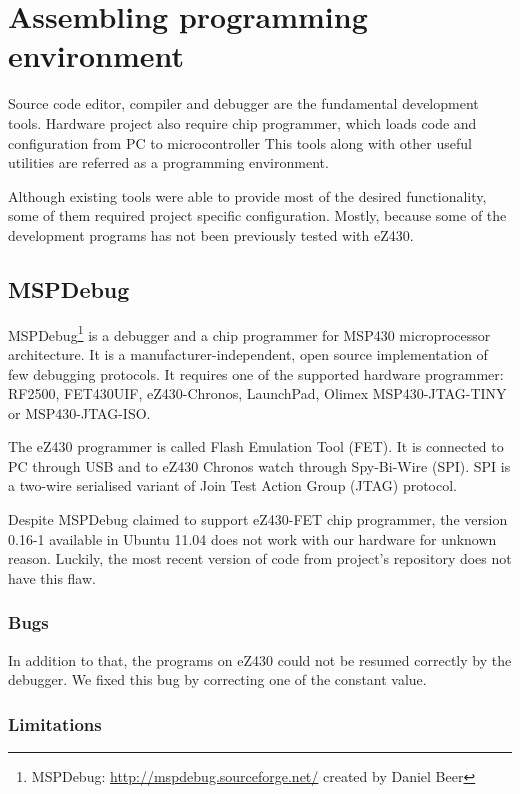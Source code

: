 \chapter{Assembling programming environment}
\label{ch:prog_env}

Source code editor, compiler and debugger are the fundamental development tools. 
Hardware project also require chip programmer, which loads code and configuration from PC to microcontroller
This tools along with other useful utilities are referred as a programming environment.

Although existing tools were able to provide most of the desired functionality, some of them required project specific configuration.
Mostly, because some of the development programs has not been previously tested with eZ430.


\section{MSPDebug}

MSPDebug\footnote{MSPDebug: \url{http://mspdebug.sourceforge.net/} created by Daniel Beer} is a debugger and a chip programmer for MSP430 microprocessor architecture.
It is a manufacturer-independent, open source implementation of few debugging protocols.
It requires one of the supported hardware programmer: RF2500, FET430UIF, eZ430-Chronos, LaunchPad, Olimex MSP430-JTAG-TINY or MSP430-JTAG-ISO.

The eZ430 programmer is called Flash Emulation Tool (FET).
It is connected to PC through USB and to eZ430 Chronos watch through Spy-Bi-Wire (SPI). 
SPI is a two-wire serialised variant of Join Test Action Group (JTAG) protocol.

Despite MSPDebug claimed to support eZ430-FET chip programmer, the version 0.16-1 available in Ubuntu 11.04 does not work with our hardware for unknown reason.
Luckily, the most recent version of code from project's repository does not have this flaw. 


\subsection{Bugs}
In addition to that, the programs on eZ430 could not be resumed correctly by the debugger.
We fixed this bug by correcting one of the constant value.

\subsection{Limitations}

